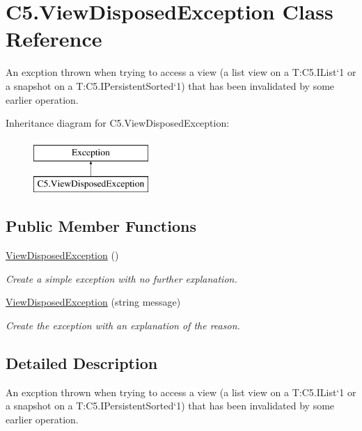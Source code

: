 \hypertarget{class_c5_1_1_view_disposed_exception}{}\section{C5.\+View\+Disposed\+Exception Class Reference}
\label{class_c5_1_1_view_disposed_exception}


An excption thrown when trying to access a view (a list view on a T\+:\+C5.\+I\+List`1 or a snapshot on a T\+:\+C5.\+I\+Persistent\+Sorted`1) that has been invalidated by some earlier operation.  


Inheritance diagram for C5.\+View\+Disposed\+Exception\+:\begin{figure}[H]
\begin{center}
\leavevmode
\includegraphics[height=2.000000cm]{class_c5_1_1_view_disposed_exception}
\end{center}
\end{figure}
\subsection*{Public Member Functions}
\begin{DoxyCompactItemize}
\item 
\hyperlink{class_c5_1_1_view_disposed_exception_a29d76d9f7065b5581be5fa0fe7f9a850}{View\+Disposed\+Exception} ()
\begin{DoxyCompactList}\small\item\em Create a simple exception with no further explanation. \end{DoxyCompactList}\item 
\hyperlink{class_c5_1_1_view_disposed_exception_a6c2bedab415d7486de0d4cbcc390ca67}{View\+Disposed\+Exception} (string message)
\begin{DoxyCompactList}\small\item\em Create the exception with an explanation of the reason. \end{DoxyCompactList}\end{DoxyCompactItemize}


\subsection{Detailed Description}
An excption thrown when trying to access a view (a list view on a T\+:\+C5.\+I\+List`1 or a snapshot on a T\+:\+C5.\+I\+Persistent\+Sorted`1) that has been invalidated by some earlier operation. 

